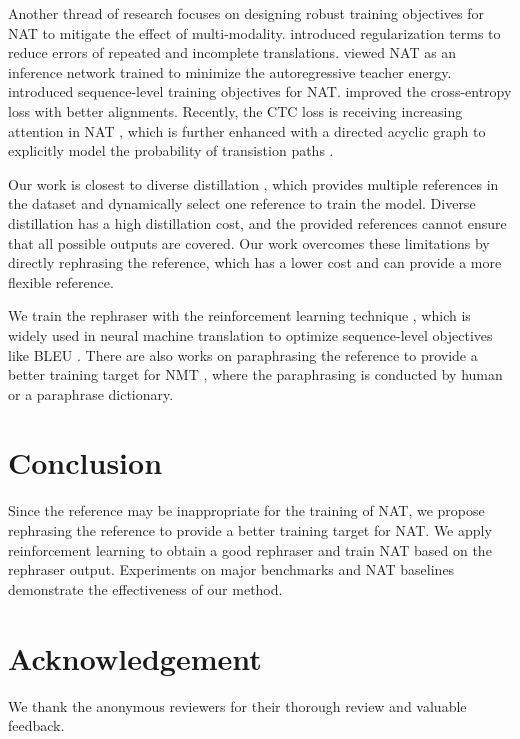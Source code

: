 \documentclass[letterpaper]{article} %
\begin{document}
Another thread of research focuses on designing robust training objectives for NAT to mitigate the effect of multi-modality. \citet{wang2019non} introduced regularization terms to reduce errors of repeated and incomplete translations. \cite{tu-etal-2020-engine} viewed NAT as an inference network trained to minimize the autoregressive teacher energy. \citet{shao-etal-2019-retrieving,DBLP:conf/aaai/ShaoZFMZ20,DBLP:journals/corr/abs-2106-08122} introduced sequence-level training objectives for NAT. \citet{Aligned,DBLP:conf/icml/DuTJ21} improved the cross-entropy loss with better alignments. Recently, the CTC loss \cite{10.1145/1143844.1143891} is receiving increasing attention in NAT \cite{libovicky2018end,saharia-etal-2020-non,gu2020fully,nmla}, which is further enhanced with a directed acyclic graph to explicitly model the probability of transistion paths \cite{huang2022directed,shao2022viterbi}.

Our work is closest to diverse distillation \cite{shao-etal-2022-one}, which provides multiple references in the dataset and dynamically select one reference to train the model. Diverse distillation has a high distillation cost, and the provided references cannot ensure that all possible outputs are covered. Our work overcomes these limitations by directly rephrasing the reference, which has a lower cost and can provide a more flexible reference.

We train the rephraser with the reinforcement learning technique \cite{williams1992simple}, which is widely used in neural machine translation to optimize sequence-level objectives like BLEU \cite{ranzato2015sequence,bahdanau2016actor,wu-etal-2018-study,DBLP:journals/corr/abs-2106-08122}. There are also works on paraphrasing the reference to provide a better training target for NMT \cite{sekizawa-etal-2017-improving,zhou-etal-2019-paraphrases,freitag-etal-2020-human}, where the paraphrasing is conducted by human or a paraphrase dictionary.

\section{Conclusion}
Since the reference may be inappropriate for the training of NAT, we propose rephrasing the reference to provide a better training target for NAT. We apply reinforcement learning to obtain a good rephraser and train NAT based on the rephraser output. Experiments on major benchmarks and NAT baselines demonstrate the effectiveness of our method.
\section{Acknowledgement}
We thank the anonymous reviewers for their thorough review and valuable feedback.

\end{document}
